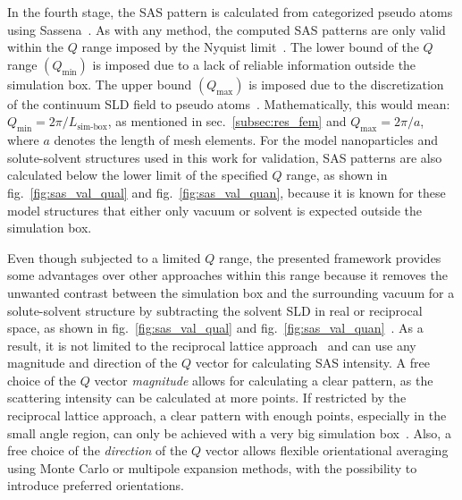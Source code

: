 \documentclass[preprint, 5p, times, twocolumn]{elsarticle}
\begin{document}
In the fourth stage, the SAS pattern is calculated from categorized pseudo atoms using Sassena~\cite{sassena}. As with any method, the computed SAS patterns are only valid within the $Q$ range imposed by the Nyquist limit~\cite{mazo1975faster}. The lower bound of the $Q$ range $(Q_{\text{min}})$ is imposed due to a lack of reliable information outside the simulation box. The upper bound $(Q_{\text{max}})$ is imposed due to the discretization of the continuum SLD field to pseudo atoms~\cite{majumdar2024computation}. Mathematically, this would mean: $Q_{\text{min}} = 2\pi / L_{\text{sim-box}}$, as mentioned in sec.~\ref{subsec:res_fem} and $Q_{\text{max}} = 2\pi / a$, where $a$ denotes the length of mesh elements. For the model nanoparticles and solute-solvent structures used in this work for validation, SAS patterns are also calculated below the lower limit of the specified $Q$ range, as shown in fig.~\ref{fig:sas_val_qual} and fig.~\ref{fig:sas_val_quan}, because it is known for these model structures that either only vacuum or solvent is expected outside the simulation box.

Even though subjected to a limited $Q$ range, the presented framework provides some advantages over other approaches within this range because it removes the unwanted contrast between the simulation box and the surrounding vacuum for a solute-solvent structure by subtracting the solvent SLD in real or reciprocal space, as shown in fig.~\ref{fig:sas_val_qual} and fig.~\ref{fig:sas_val_quan}~\cite{majumdar2024computation}. As a result, it is not limited to the reciprocal lattice approach~\cite{frenkel1986structure} and can use any magnitude and direction of the $Q$ vector for calculating SAS intensity. A free choice of the $Q$ vector \emph{magnitude} allows for calculating a clear pattern, as the scattering intensity can be calculated at more points. If restricted by the reciprocal lattice approach, a clear pattern with enough points, especially in the small angle region, can only be achieved with a very big simulation box~\cite{brisard2013small}. Also, a free choice of the \emph{direction} of the $Q$ vector allows flexible orientational averaging using Monte Carlo or multipole expansion methods, with the possibility to introduce preferred orientations. 
\end{document}
